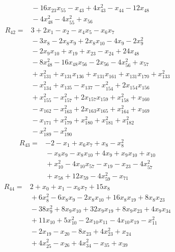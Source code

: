 {\begin{align*}
&{}  - 16x_{23} x_{55} - x_{43} + 4x_{43}^{2} - x_{44} - 12x_{48} \\
&{}  - 4x_{48}^{2} - 4x_{55}^{2} + x_{56}
\end{align*}
\begin{align*}
R_{42} ={}& 3 + 2x_{1} - x_{2} - x_{4} x_{5} - x_{6} x_{7} \\
&{}  - 3x_{8} - 2x_{8} x_{9} + 2x_{8} x_{10} - 4x_{9} - 2x_{9}^{2} \\
&{}  - 2x_{9} x_{10} + x_{19} + x_{23} - x_{24} + 24x_{48} \\
&{}  - 8x_{48}^{2} - 16x_{48} x_{56} - 2x_{56} - 4x_{56}^{2} + x_{57} \\
&{}  + x_{131}^{2} + x_{131} x_{136} + x_{131} x_{161} + x_{131} x_{170} + x_{133}^{2} \\
&{}  - x_{134}^{2} + x_{135} - x_{137} - x_{154}^{2} + 2x_{154} x_{156} \\
&{}  + x_{155}^{2} - x_{157}^{2} + 2x_{157} x_{159} + x_{158}^{2} + x_{160} \\
&{}  - x_{162} - x_{163}^{2} + 2x_{163} x_{165} + x_{164}^{2} + x_{169} \\
&{}  - x_{171} + x_{179}^{2} + x_{180}^{2} + x_{181}^{2} + x_{182}^{2} \\
&{}  - x_{189}^{2} - x_{190}^{2}
\end{align*}
\begin{align*}
R_{43} ={}& -2 - x_{1} + x_{6} x_{7} + x_{8} - x_{8}^{2} \\
&{}  - x_{8} x_{9} - x_{8} x_{10} + 4x_{9} + x_{9} x_{10} + x_{10} \\
&{}  + x_{10}^{2} - 4x_{10} x_{57} - x_{19} - x_{23} - 4x_{57}^{2} \\
&{}  + x_{58} + 12x_{59} - 4x_{59}^{2} - x_{71}
\end{align*}
\begin{align*}
R_{44} ={}& 2 + x_{0} + x_{1} - x_{6} x_{7} + 15x_{8} \\
&{}  + 6x_{8}^{2} - 6x_{8} x_{9} - 2x_{8} x_{10} + 16x_{8} x_{19} + 8x_{8} x_{23} \\
&{}  - 38x_{9}^{2} + 8x_{9} x_{10} + 32x_{9} x_{19} + 8x_{9} x_{23} + 4x_{9} x_{34} \\
&{}  + 11x_{10} + 5x_{10}^{2} - 2x_{10} x_{11} - 4x_{10} x_{19} - x_{11}^{2} \\
&{}  - 2x_{19} - x_{20} - 8x_{23} + 4x_{23}^{2} + x_{24} \\
&{}  + 4x_{25}^{2} - x_{26} + 4x_{34}^{2} - x_{35} + x_{39} \\

\end{align*}}
